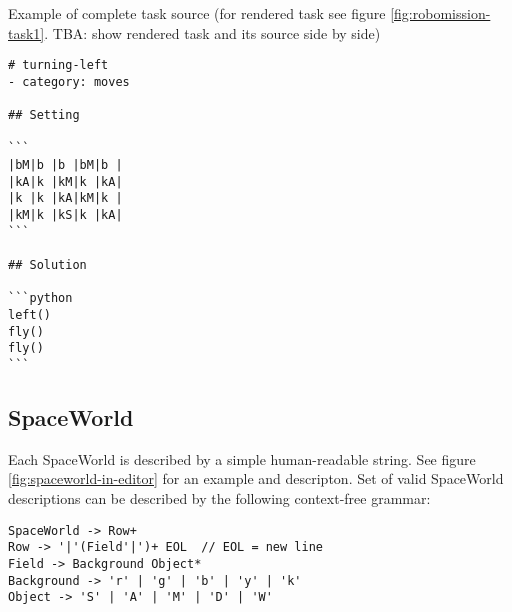 Example of complete task source (for rendered task see figure \ref{fig:robomission-task1}. TBA: show rendered task and its source side by side)

\begin{lstlisting}
# turning-left
- category: moves

## Setting

```
|bM|b |b |bM|b |
|kA|k |kM|k |kA|
|k |k |kA|kM|k |
|kM|k |kS|k |kA|
```

## Solution

```python
left()
fly()
fly()
```
\end{lstlisting}


\subsection{SpaceWorld}

Each SpaceWorld is described by a simple human-readable string.
See figure \ref{fig:spaceworld-in-editor} for an example and descripton.
Set of valid SpaceWorld descriptions can be described by the
following context-free grammar:

\begin{lstlisting}
SpaceWorld -> Row+
Row -> '|'(Field'|')+ EOL  // EOL = new line
Field -> Background Object*
Background -> 'r' | 'g' | 'b' | 'y' | 'k'
Object -> 'S' | 'A' | 'M' | 'D' | 'W'
\end{lstlisting}




